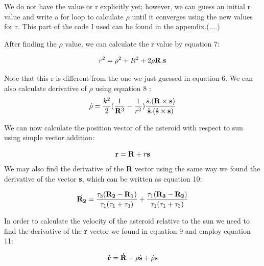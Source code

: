 \documentclass[letterpaper,12pt]{article}
\begin{document}
We do not have the value or r explicitly yet; however, we can guess an initial r value and write a for loop to calculate \begin{math} \rho \end{math} until it converges using the new values for r. This part of the code I used can be found in the appendix.(....)


After finding the \begin{math} \rho \end{math} value, we can calculate the r value by equation 7:

\begin{equation}
r^2=\rho ^2 + R^2 + 2\rho {\bf R}. {\bf s}
\end{equation}

Note that this r is different from the one we just guessed in equation 6. 
We can also calculate derivative of \begin{math} \rho \end{math} using equation 8 :
\begin{equation}
\dot{\rho}=\frac{k^2}{2}(\frac{1}{{\bf R}^3}-\frac{1}{r^3})\frac{\ddot{s}.({\bf R}\times {\bf s})}{\ddot{{\bf s}}.({\bf \dot{s}}\times {\bf s})}
\end{equation}

We can now calculate the position vector of the asteroid with respect to sun using simple vector addition:

\begin{equation}
{\bf r}= {\bf R}+r{\bf s}
\end{equation}
We may also find the derivative of the {\bf R} vector using the same way we found the derivative of the vector {\bf s}, which can be written as equation 10:

\begin{equation}
\dot{{\bf R_{2}}}=\frac{\tau_{3}({\bf R_{2}}-{\bf R_{1}})}{\tau_{1}(\tau_{1}+\tau_{3})}+\frac{\tau_{1}({\bf R_{3}}-{\bf R_{2}})}{\tau_{1}(\tau_{1}+\tau_{3})}
\end{equation}

In order to calculate the velocity of the asteroid relative to the sun we need to find the derivative of the {\bf r} vector we found in equation 9 and employ equation 11:

\begin{equation}
{\bf \dot{r}}={\bf \dot{R}} +\rho{\dot{\bf s}} + \dot{\rho} {\bf s}
\end{equation}
\end{document}
